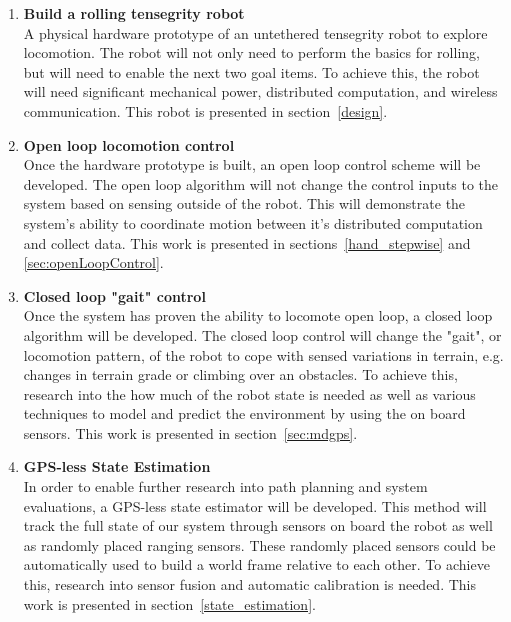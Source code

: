 \begin{enumerate}[leftmargin=.5cm]
\item \textbf{Build a rolling tensegrity robot}\\
A physical hardware prototype of an untethered tensegrity robot to explore locomotion.
The robot will not only need to perform the basics for rolling, but will need to enable the next two goal items.
To achieve this, the robot will need significant mechanical power, distributed computation, and wireless communication.
This robot is presented in section~\ref{design}.

\item \textbf{Open loop locomotion control}\\
Once the hardware prototype is built, an open loop control scheme will be developed.
The open loop algorithm will not change the control inputs to the system based on sensing outside of the robot.
This will demonstrate the system's ability to coordinate motion between it's distributed computation and collect data.
This work is presented in sections~\ref{hand_stepwise} and \ref{sec:openLoopControl}.

\item \textbf{Closed loop "gait" control}\\
Once the system has proven the ability to locomote open loop, a closed loop algorithm will be developed.
The closed loop control will change the "gait", or locomotion pattern, of the robot to cope with sensed variations in terrain, e.g. changes in terrain grade or climbing over an obstacles.
To achieve this, research into the how much of the robot state is needed as well as various techniques to model and predict the environment by using the on board sensors.
This work is presented in section~\ref{sec:mdgps}.

\item \textbf{GPS-less State Estimation}\\
In order to enable further research into path planning and system evaluations, a GPS-less state estimator will be developed.
This method will track the full state of our system through sensors on board the robot as well as randomly placed ranging sensors.
These randomly placed sensors could be automatically used to build a world frame relative to each other.
To achieve this, research  into sensor fusion and automatic calibration is needed.
This work is presented in section~\ref{state_estimation}.
\end{enumerate}
